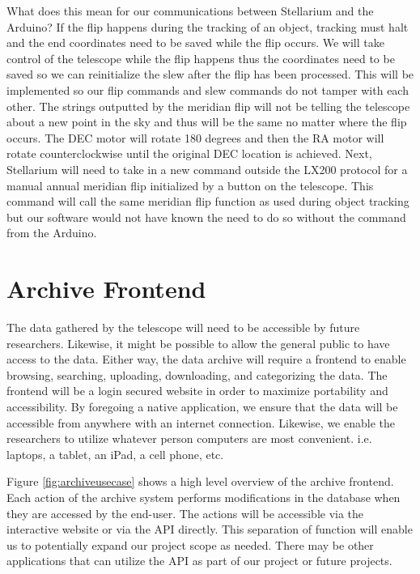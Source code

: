 \documentclass[12pt]{report}
\begin{document}
\begin{enumerate}
What does this mean for our communications between Stellarium and the Arduino? If the flip happens during the tracking of an object, tracking must halt and the end coordinates need to be saved while the flip occurs. We will take control of the telescope while the flip happens thus the coordinates need to be saved so we can reinitialize the slew after the flip has been processed. This will be implemented so our flip commands and slew commands do not tamper with each other. The strings outputted by the meridian flip will not be telling the telescope about a new point in the sky and thus will be the same no matter where the flip occurs. The DEC motor will rotate 180 degrees and then the RA motor will rotate counterclockwise until the original DEC location is achieved. Next, Stellarium will need to take in a new command outside the LX200 protocol for a manual annual meridian flip initialized by a button on the telescope. This command will call the same meridian flip function as used during object tracking but our software would not have known the need to do so without the command from the Arduino.



\section*{Archive Frontend}

The data gathered by the telescope will need to be accessible by future researchers. Likewise, it might be possible to allow the general public to have access to the data. Either way, the data archive will require a frontend to enable browsing, searching, uploading, downloading, and categorizing the data. The frontend will be a login secured website in order to maximize portability and accessibility. By foregoing a native application, we ensure that the data will be accessible from anywhere with an internet connection. Likewise, we enable the researchers to utilize whatever person computers are most convenient. i.e. laptops, a tablet, an iPad, a cell phone, etc.

Figure \ref{fig:archiveusecase} shows a high level overview of the archive frontend. Each action of the archive system performs modifications in the database when they are accessed by the end-user. The actions will be accessible via the interactive website or via the API directly. This separation of function will enable us to potentially expand our project scope as needed. There may be other applications that can utilize the API as part of our project or future projects.


\end{enumerate}
\end{document}
